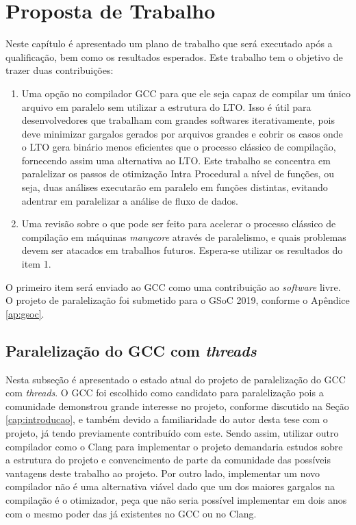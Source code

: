 \chapter{Proposta de Trabalho}
\label{chap:proposta}

Neste capítulo é apresentado um plano de trabalho que será executado após a qualificação, bem como os resultados esperados.
Este trabalho tem o objetivo de trazer duas contribuições:
\begin{enumerate}
    \item Uma opção no compilador GCC para que ele seja
capaz de compilar um único arquivo em paralelo sem utilizar a
estrutura do LTO. Isso é útil para desenvolvedores que trabalham
com grandes softwares iterativamente, pois deve minimizar
gargalos gerados por arquivos grandes e cobrir os casos onde o LTO gera
binário menos eficientes que o processo clássico de compilação, fornecendo assim
uma alternativa ao LTO.
Este trabalho se concentra em paralelizar os passos de otimização Intra Procedural
a nível de funções, ou seja, duas análises executarão em paralelo em funções
distintas, evitando adentrar em paralelizar a análise de fluxo de dados.

    \item Uma revisão sobre o que pode ser feito para acelerar o
processo clássico de compilação em máquinas \textit{manycore} através
de paralelismo, e quais problemas devem ser atacados em trabalhos futuros.
Espera-se utilizar os resultados do item 1.
\end{enumerate}
O primeiro item será enviado ao GCC como uma contribuição
ao \textit{software} livre. O projeto de paralelização foi submetido para o GSoC 2019,
conforme o Apêndice \ref{ap:gsoc}.


\section{Paralelização do GCC com \textit{threads}}

Nesta subseção é apresentado o estado atual do projeto de paralelização
do GCC com \textit{threads}. O GCC foi escolhido como candidato para
paralelização pois a comunidade demonstrou grande interesse no projeto,
conforme discutido na Seção \ref{cap:introducao}, e também devido a familiaridade
do autor desta tese com o projeto, já tendo previamente contribuído com este. Sendo assim,
utilizar outro compilador como o Clang para implementar o projeto demandaria
estudos sobre a estrutura do projeto e convencimento de parte da comunidade das
possíveis vantagens deste trabalho ao projeto. Por outro lado, implementar um
novo compilador não é uma alternativa viável dado que um dos maiores gargalos
na compilação é o otimizador, peça que não seria possível implementar em
dois anos com o mesmo poder das já existentes no GCC ou no Clang.

